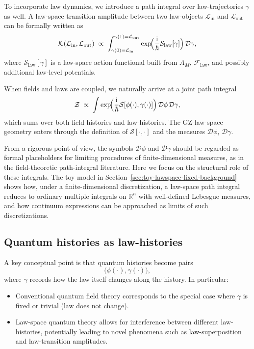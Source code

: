 \documentclass[11pt]{book}
\newcommand{\GZLOC}{\ensuremath{A_M}}
\newcommand{\GZLCurv}{\ensuremath{\mathcal{F}_{\mathrm{law}}}}
\theoremstyle{plain}
\theoremstyle{definition}
\theoremstyle{remark}
\begin{document}
To incorporate law dynamics, we introduce a path integral over
law-trajectories $\gamma$ as well. A law-space transition amplitude
between two law-objects $\mathcal{L}_{\mathrm{in}}$ and
$\mathcal{L}_{\mathrm{out}}$ can be formally written as
\[
   \mathcal{K}(\mathcal{L}_{\mathrm{in}},\mathcal{L}_{\mathrm{out}})
   \;\propto\;
   \int_{\gamma(0)=\mathcal{L}_{\mathrm{in}}}^{\gamma(1)=\mathcal{L}_{\mathrm{out}}}
   \exp\!\Bigl(\frac{\mathrm{i}}{\hbar} \mathcal{S}_{\mathrm{law}}[\gamma]\Bigr)
   \,\mathcal{D}\gamma,
\]
where $\mathcal{S}_{\mathrm{law}}[\gamma]$ is a law-space action
functional built from $\GZLOC$, $\GZLCurv$, and possibly additional
law-level potentials.

When fields and laws are coupled, we naturally arrive at a joint
path integral
\[
   \mathcal{Z}
   \;\propto\;
   \int \exp\!\Bigl(\frac{\mathrm{i}}{\hbar}
   \mathcal{S}[\phi(\cdot),\gamma(\cdot)]\Bigr)\,
   \mathcal{D}\phi\,\mathcal{D}\gamma,
\]
which sums over both field histories and law-histories. The
GZ-law-space geometry enters through the definition of
$\mathcal{S}[\cdot,\cdot]$ and the measures
$\mathcal{D}\phi$, $\mathcal{D}\gamma$.

From a rigorous point of view, the symbols $\mathcal{D}\phi$ and
$\mathcal{D}\gamma$ should be regarded as formal placeholders for
limiting procedures of finite-dimensional measures, as in the
field-theoretic path-integral literature. Here we focus on the
structural role of these integrals. The toy model in
Section~\ref{sec:toy-lawspace-fixed-background} shows how, under a
finite-dimensional discretization, a law-space path integral reduces
to ordinary multiple integrals on $\mathbb{R}^n$ with well-defined
Lebesgue measures, and how continuum expressions can be approached as
limits of such discretizations.

\subsection{Quantum histories as law-histories}

A key conceptual point is that quantum histories become pairs
\[
   \bigl(\phi(\cdot),\gamma(\cdot)\bigr),
\]
where $\gamma$ records how the law itself changes along the history.
In particular:
\begin{itemize}
  \item Conventional quantum field theory corresponds to the special
        case where $\gamma$ is fixed or trivial (law does not change).
  \item Law-space quantum theory allows for interference between
        different law-histories, potentially leading to novel
        phenomena such as law-superposition and law-transition
        amplitudes.
\end{itemize}
\end{document}
